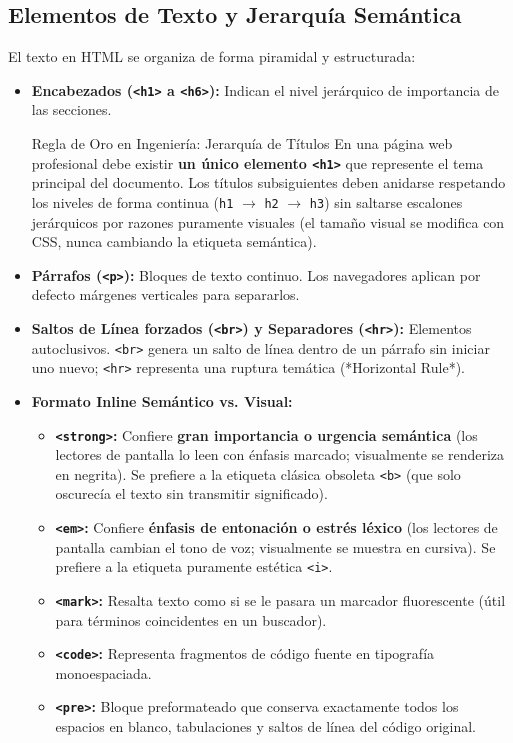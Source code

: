 \subsection{Elementos de Texto y Jerarquía Semántica}

El texto en HTML se organiza de forma piramidal y estructurada:

\begin{itemize}[leftmargin=1.2cm]
  \item \textbf{Encabezados (\texttt{<h1>} a \texttt{<h6>}):} Indican el nivel jerárquico de importancia de las secciones.
    \begin{importante}{Regla de Oro en Ingeniería: Jerarquía de Títulos}
    En una página web profesional debe existir \textbf{un único elemento \texttt{<h1>}} que represente el tema principal del documento. Los títulos subsiguientes deben anidarse respetando los niveles de forma continua (\texttt{h1} $\rightarrow$ \texttt{h2} $\rightarrow$ \texttt{h3}) sin saltarse escalones jerárquicos por razones puramente visuales (el tamaño visual se modifica con CSS, nunca cambiando la etiqueta semántica).
    \end{importante}
  \item \textbf{Párrafos (\texttt{<p>}):} Bloques de texto continuo. Los navegadores aplican por defecto márgenes verticales para separarlos.
  \item \textbf{Saltos de Línea forzados (\texttt{<br>}) y Separadores (\texttt{<hr>}):} Elementos autoclusivos. \texttt{<br>} genera un salto de línea dentro de un párrafo sin iniciar uno nuevo; \texttt{<hr>} representa una ruptura temática (*Horizontal Rule*).
  \item \textbf{Formato Inline Semántico vs. Visual:}
    \begin{itemize}
      \item \textbf{\texttt{<strong>}:} Confiere \textbf{gran importancia o urgencia semántica} (los lectores de pantalla lo leen con énfasis marcado; visualmente se renderiza en negrita). Se prefiere a la etiqueta clásica obsoleta \texttt{<b>} (que solo oscurecía el texto sin transmitir significado).
      \item \textbf{\texttt{<em>}:} Confiere \textbf{énfasis de entonación o estrés léxico} (los lectores de pantalla cambian el tono de voz; visualmente se muestra en cursiva). Se prefiere a la etiqueta puramente estética \texttt{<i>}.
      \item \textbf{\texttt{<mark>}:} Resalta texto como si se le pasara un marcador fluorescente (útil para términos coincidentes en un buscador).
      \item \textbf{\texttt{<code>}:} Representa fragmentos de código fuente en tipografía monoespaciada.
      \item \textbf{\texttt{<pre>}:} Bloque preformateado que conserva exactamente todos los espacios en blanco, tabulaciones y saltos de línea del código original.
    \end{itemize}
\end{itemize}

